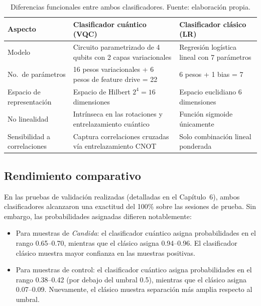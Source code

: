 \documentclass[11pt,a4paper,spanish]{book}
\begin{document}
\begin{table}[ht]
\centering
\begin{tabular}{l p{5cm} p{5cm}}
\hline\hline
Aspecto & Clasificador cu\'{a}ntico (VQC) & Clasificador cl\'{a}sico (LR) \\ [0.5ex]
\hline
Modelo & Circuito parametrizado de 4 qubits con 2 capas variacionales & Regresi\'{o}n log\'{i}stica lineal con 7 par\'{a}metros \\
No.\ de par\'{a}metros & 16 pesos variacionales + 6 pesos de feature drive = 22 & 6 pesos + 1 bias = 7 \\
Espacio de representaci\'{o}n & Espacio de Hilbert $2^4 = 16$ dimensiones & Espacio euclidiano 6 dimensiones \\
No linealidad & Intr\'{i}nseca en las rotaciones y entrelazamiento cu\'{a}ntico & Funci\'{o}n sigmoide \'{u}nicamente \\
Sensibilidad a correlaciones & Captura correlaciones cruzadas v\'{i}a entrelazamiento CNOT & Solo combinaci\'{o}n lineal ponderada \\
\hline
\end{tabular}
\caption[Comparaci\'{o}n cu\'{a}ntico vs.\ cl\'{a}sico]{Diferencias funcionales entre ambos clasificadores. Fuente: elaboraci\'{o}n propia.}
\label{tab:comparacion-q-vs-c}
\end{table}

\subsection{Rendimiento comparativo}

En las pruebas de validaci\'{o}n realizadas (detalladas en el Cap\'{i}tulo~6), ambos clasificadores alcanzaron una exactitud del 100\% sobre las sesiones de prueba. Sin embargo, las probabilidades asignadas difieren notablemente:

\begin{itemize}
	\item Para muestras de \textit{Candida}: el clasificador cu\'{a}ntico asigna probabilidades en el rango 0.65--0.70, mientras que el cl\'{a}sico asigna 0.94--0.96. El clasificador cl\'{a}sico muestra mayor confianza en las muestras positivas.
	\item Para muestras de control: el clasificador cu\'{a}ntico asigna probabilidades en el rango 0.38--0.42 (por debajo del umbral 0.5), mientras que el cl\'{a}sico asigna 0.07--0.09. Nuevamente, el cl\'{a}sico muestra separaci\'{o}n m\'{a}s amplia respecto al umbral.
\end{itemize}
\end{document}
